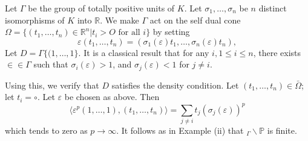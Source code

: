 \begin{examples*}
  Let $\Gamma $ be the group of totally positive units of $K$.  Let
  $\sigma_1, \ldots, \sigma_n$ be $n$ distinct isomorphisms of $K$ into
  $\mathbb{R}$. We make $\Gamma$ act on the self dual cone $\Omega =
  \bigg \{(t_1,\ldots,t_n) \in \mathbb{R}^n|t_i >O \text{ for all }i
  \bigg \}$ by setting 
  $$
  \varepsilon (t_1,\ldots ,t_n)=(\sigma_1 (\varepsilon)
  t_1,\ldots,\sigma_n(\varepsilon)t_n), 
  $$
  Let $D=\Gamma\bigg \{ (1,\ldots,1\bigg\}$. It is a classical result
  that for any $i, 1 \leq i \leq n$, there exists $\in \in \Gamma$ such
  that $\sigma_i(\varepsilon) > 1$, and $\sigma_j (\varepsilon)<1$ for
  $j \neq i$.  
  
  Using this, we verify that $D$ satisfies the density condition. Let
  $(t_1, \ldots,t_n)\in \bar{\Omega}$; let $t_i =\circ$. Let $\varepsilon$
  be chosen as above. Then  
  $$
  \langle \varepsilon^p (1, \ldots,1), (t_1,\ldots ,t_n)\rangle =\sum_{j
    \neq i} t_j (\sigma_j (\varepsilon))^p 
  $$
  which tends to zero as $p \to \infty$. It follows as in Example (ii)
  that $_\Gamma \backslash\mathbb{P}$ is finite. 
\end{examples*}



